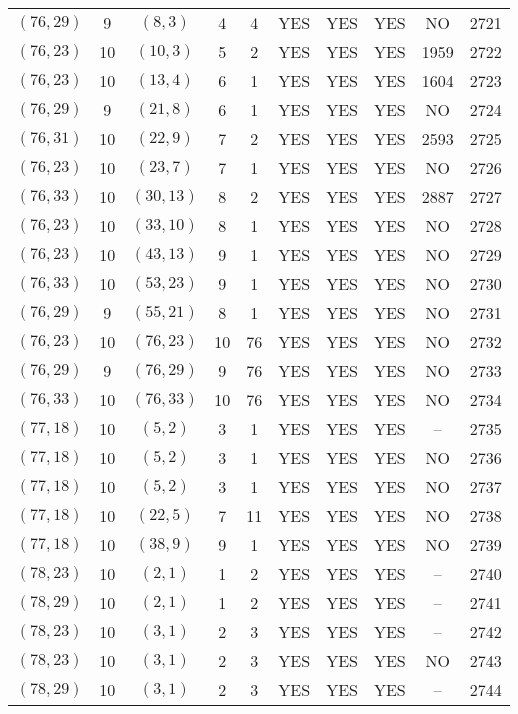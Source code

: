 \begin{longtable}{|c|c|c|c|c|c|c|c|c|c|}
$(76, 29)$ & 9 & $(8, 3)$ & 4 & 4 & YES & YES & YES & NO & 2721\\
$(76, 23)$ & 10 & $(10, 3)$ & 5 & 2 & YES & YES & YES & 1959 & 2722\\
$(76, 23)$ & 10 & $(13, 4)$ & 6 & 1 & YES & YES & YES & 1604 & 2723\\
$(76, 29)$ & 9 & $(21, 8)$ & 6 & 1 & YES & YES & YES & NO & 2724\\
$(76, 31)$ & 10 & $(22, 9)$ & 7 & 2 & YES & YES & YES & 2593 & 2725\\
$(76, 23)$ & 10 & $(23, 7)$ & 7 & 1 & YES & YES & YES & NO & 2726\\
$(76, 33)$ & 10 & $(30, 13)$ & 8 & 2 & YES & YES & YES & 2887 & 2727\\
$(76, 23)$ & 10 & $(33, 10)$ & 8 & 1 & YES & YES & YES & NO & 2728\\
$(76, 23)$ & 10 & $(43, 13)$ & 9 & 1 & YES & YES & YES & NO & 2729\\
$(76, 33)$ & 10 & $(53, 23)$ & 9 & 1 & YES & YES & YES & NO & 2730\\
$(76, 29)$ & 9 & $(55, 21)$ & 8 & 1 & YES & YES & YES & NO & 2731\\
$(76, 23)$ & 10 & $(76, 23)$ & 10 & 76 & YES & YES & YES & NO & 2732\\
$(76, 29)$ & 9 & $(76, 29)$ & 9 & 76 & YES & YES & YES & NO & 2733\\
$(76, 33)$ & 10 & $(76, 33)$ & 10 & 76 & YES & YES & YES & NO & 2734\\
$(77, 18)$ & 10 & $(5, 2)$ & 3 & 1 & YES & YES & YES & -- & 2735\\
$(77, 18)$ & 10 & $(5, 2)$ & 3 & 1 & YES & YES & YES & NO & 2736\\
$(77, 18)$ & 10 & $(5, 2)$ & 3 & 1 & YES & YES & YES & NO & 2737\\
$(77, 18)$ & 10 & $(22, 5)$ & 7 & 11 & YES & YES & YES & NO & 2738\\
$(77, 18)$ & 10 & $(38, 9)$ & 9 & 1 & YES & YES & YES & NO & 2739\\
$(78, 23)$ & 10 & $(2, 1)$ & 1 & 2 & YES & YES & YES & -- & 2740\\
$(78, 29)$ & 10 & $(2, 1)$ & 1 & 2 & YES & YES & YES & -- & 2741\\
$(78, 23)$ & 10 & $(3, 1)$ & 2 & 3 & YES & YES & YES & -- & 2742\\
$(78, 23)$ & 10 & $(3, 1)$ & 2 & 3 & YES & YES & YES & NO & 2743\\
$(78, 29)$ & 10 & $(3, 1)$ & 2 & 3 & YES & YES & YES & -- & 2744\\

\end{longtable}
